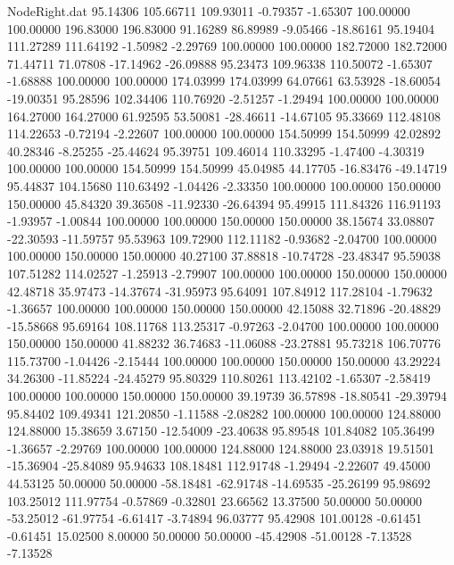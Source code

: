 \begin{filecontents}{NodeRight.dat}
  95.14306  105.66711  109.93011    -0.79357   -1.65307  100.00000  100.00000  196.83000  196.83000   91.16289   86.89989   -9.05466  -18.86161
  95.19404  111.27289  111.64192    -1.50982   -2.29769  100.00000  100.00000  182.72000  182.72000   71.44711   71.07808  -17.14962  -26.09888
  95.23473  109.96338  110.50072    -1.65307   -1.68888  100.00000  100.00000  174.03999  174.03999   64.07661   63.53928  -18.60054  -19.00351
  95.28596  102.34406  110.76920    -2.51257   -1.29494  100.00000  100.00000  164.27000  164.27000   61.92595   53.50081  -28.46611  -14.67105
  95.33669  112.48108  114.22653    -0.72194   -2.22607  100.00000  100.00000  154.50999  154.50999   42.02892   40.28346   -8.25255  -25.44624
  95.39751  109.46014  110.33295    -1.47400   -4.30319  100.00000  100.00000  154.50999  154.50999   45.04985   44.17705  -16.83476  -49.14719
  95.44837  104.15680  110.63492    -1.04426   -2.33350  100.00000  100.00000  150.00000  150.00000   45.84320   39.36508  -11.92330  -26.64394
  95.49915  111.84326  116.91193    -1.93957   -1.00844  100.00000  100.00000  150.00000  150.00000   38.15674   33.08807  -22.30593  -11.59757
  95.53963  109.72900  112.11182    -0.93682   -2.04700  100.00000  100.00000  150.00000  150.00000   40.27100   37.88818  -10.74728  -23.48347
  95.59038  107.51282  114.02527    -1.25913   -2.79907  100.00000  100.00000  150.00000  150.00000   42.48718   35.97473  -14.37674  -31.95973
  95.64091  107.84912  117.28104    -1.79632   -1.36657  100.00000  100.00000  150.00000  150.00000   42.15088   32.71896  -20.48829  -15.58668
  95.69164  108.11768  113.25317    -0.97263   -2.04700  100.00000  100.00000  150.00000  150.00000   41.88232   36.74683  -11.06088  -23.27881
  95.73218  106.70776  115.73700    -1.04426   -2.15444  100.00000  100.00000  150.00000  150.00000   43.29224   34.26300  -11.85224  -24.45279
  95.80329  110.80261  113.42102    -1.65307   -2.58419  100.00000  100.00000  150.00000  150.00000   39.19739   36.57898  -18.80541  -29.39794
  95.84402  109.49341  121.20850    -1.11588   -2.08282  100.00000  100.00000  124.88000  124.88000   15.38659    3.67150  -12.54009  -23.40638
  95.89548  101.84082  105.36499    -1.36657   -2.29769  100.00000  100.00000  124.88000  124.88000   23.03918   19.51501  -15.36904  -25.84089
  95.94633  108.18481  112.91748    -1.29494   -2.22607   49.45000   44.53125   50.00000   50.00000  -58.18481  -62.91748  -14.69535  -25.26199
  95.98692  103.25012  111.97754    -0.57869   -0.32801   23.66562   13.37500   50.00000   50.00000  -53.25012  -61.97754   -6.61417   -3.74894
  96.03777   95.42908  101.00128    -0.61451   -0.61451   15.02500    8.00000   50.00000   50.00000  -45.42908  -51.00128   -7.13528   -7.13528

\end{filecontents}

